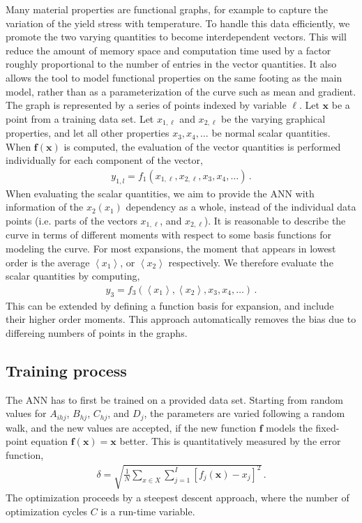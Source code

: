 \documentclass[review]{elsarticle}
\newcommand{\punc}[1]{\,#1}
\newcommand{\anglemean}[1]{\left\langle#1\right\rangle}
\newcommand{\change}[1]{#1}
\newcommand{\vx}{\textbf{x}}
\newcommand{\vf}{\textbf{f}}
\begin{document}
Many material properties are functional graphs, for example to capture the
variation of the yield stress with temperature\cite{Ritchie73}. To handle
this data efficiently, we promote the two varying quantities to become
interdependent vectors. This will reduce the amount of memory space and
computation time used by a factor roughly proportional to the number of
entries in the vector quantities. \change{It also allows the tool to model
  functional properties on the same footing as the main model, rather than
  as a parameterization of the curve such as mean and gradient. The graph is
  represented by a series of points indexed by variable $\ell$.} Let $\vx$
be a point from a training data set. Let $x_{1,\ell}$ and $x_{2,\ell}$ be
the varying graphical properties, and let all other properties
$x_3,x_4,\ldots$ be normal scalar quantities. When $\vf(\vx)$ is computed,
the evaluation of the vector quantities is performed individually for each
component of the vector,
%
\begin{align}
 y_{1,l}=f_1(x_{1,\ell},x_{2,\ell},x_3,x_4,\ldots)\punc{.}
\end{align}
%
When evaluating the scalar quantities, we aim to provide the ANN with
information of the $x_2(x_1)$ dependency as a whole, instead of the
individual data points (i.e. parts of the vectors $x_{1,\ell}$, and
$x_{2,\ell}$). It is reasonable to describe the curve in terms of different
moments with respect to some basis functions for modeling the curve. For
most expansions, the moment that appears in lowest order is the average
$\anglemean{x_1}$, or $\anglemean{x_2}$ respectively. We therefore evaluate
the scalar quantities by computing,
%
\begin{align}
 y_3=f_3(\anglemean{x_1},\anglemean{x_2},x_3,x_4,\ldots)\punc{.}
\end{align}
%
This can be extended by defining a function basis for expansion, and 
include their higher order moments. \change{This approach automatically
  removes the bias due to differeing numbers of points in the graphs.}

\subsection{Training process}\label{sec:frameworktrain}

The ANN has to first be trained on a provided data set. Starting from random
values for $A_{ihj}$, $B_{hj}$, $C_{hj}$, and $D_j$, the parameters are
varied following a random walk, and the new values are accepted, if the new
function $\vf$ models the fixed-point equation $\vf(\vx)=\vx$ better. This
is quantitatively measured by the error function,
%
\begin{align}
 \delta=\sqrt{\frac{1}{N}\sum_{x\in X}\sum_{j=1}^I\left[ f_j(\vx)-x_j\right]^2}\punc{.}
 \label{eq:rms}
\end{align}
%
The optimization proceeds by a steepest descent approach\cite{Floudas08},
where the number of optimization cycles $C$ is a run-time variable.
\end{document}
